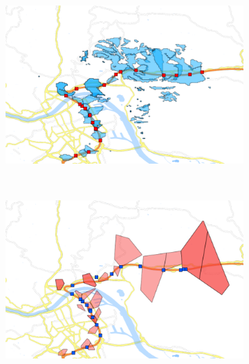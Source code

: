 \begin{figure}
	\centering
	\begin{subfigure}[b]{0.5\linewidth}
		\includegraphics[width=\textwidth]{./images/563_Coverage_Handover}
		\caption{}
		\label{fig:563coverage}
	\end{subfigure}%
	~
	\begin{subfigure}[b]{0.5\linewidth}
		\includegraphics[width=\textwidth]{./images/563_Voronoi_Handover}
		\caption{}
		\label{fig:563voronoi}
	\end{subfigure}


\end{figure}
